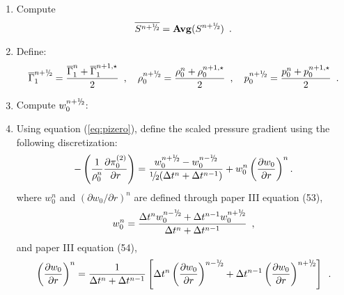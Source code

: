 \begin{description}
\begin{enumerate}
\item Compute
\begin{equation}
\overline{S^{\nph}} = {\mathrm{\bf Avg}} (S^{\nph}) \enskip.
\end{equation}

\item Define:
\begin{equation}
\gammabar^{\nph} = \frac{\gammabar^{n} + \gammabar^{n+1,\star}}{2}\enskip , ~~~
\rhozero^{\nph} = \frac{\rhozero^{n} + \rhozero^{n+1,\star}}{2}\enskip , ~~~
p_0^{\nph} = \frac{p_0^{n} + p_0^{n+1,\star}}{2}\enskip .
\end{equation}
\item Compute $w_0^{n+\myhalf}$:

\item Using equation (\ref{eq:pizero}), define the scaled pressure gradient using the
following discretization:
\begin{equation}
-\left ( \frac{1}{\rho_0^n} \frac{\partial \pizerotwo}{\partial r} \right ) = 
\frac{w_0^{\nph} - w_0^\nmh}{\myhalf(\dt^n+\dt^{n-1})} 
+ w_0^n \left(\frac{\partial w_0}{\partial r}\right)^n.
\end{equation}
where $w_0^n$ and $(\partial w_0 / \partial r)^{n}$ are defined through paper III equation (53),
\begin{equation}
w_0^n = \frac{\dt^{n} w_0^{\nmh} + \dt^{n-1} w_0^{\nph}}{\dt^n+\dt^{n-1}}\enskip,\label{eq:w0nstar}
\end{equation}
and paper III equation (54),
\begin{equation}
\left(\frac{\partial w_0}{\partial r}\right)^{n} = \frac{1}{\dt^n+\dt^{n-1} } \left [ \dt^{n} \left(\frac{\partial w_0 }{ \partial r}\right)^{\nmh}
+ \dt^{n-1} \left(\frac{\partial w_0 }{ \partial r}\right)^{\nph} \right ] \enskip.\label{eq:dw0drnstar}
\end{equation}


\end{enumerate}
\end{description}
